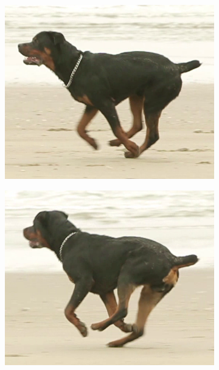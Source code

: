 \begin{figure}[t]
    \centering
    \begin{subfigure}{0.33\textwidth}
    \centering
        \includegraphics[width=1\linewidth]{input/66}
    \end{subfigure}%
    \begin{subfigure}{0.33\textwidth}
    \centering
        \includegraphics[width=1\linewidth]{input/167}
    \end{subfigure}%
    \begin{subfigure}{0.33\textwidth}

\end{subfigure}
\end{figure}
